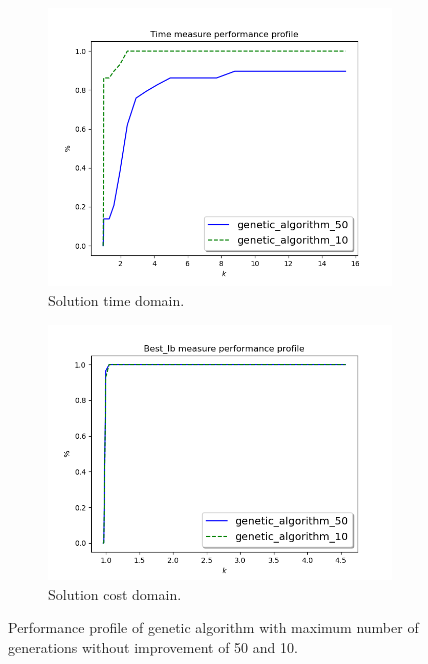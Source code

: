 \begin{figure}[!h]
	\centering
	\begin{subfigure}{0.7\columnwidth}
		\centering
		\includegraphics[width=\columnwidth]{../res/ga_10_50_time.png}
		\caption{Solution time domain.}
		\label{fig:ga_10_50_time}
	\end{subfigure}
	\begin{subfigure}{0.7\columnwidth}
		\centering
		\includegraphics[width=\columnwidth]{../res/ga_10_50_lb.png}
		\caption{Solution cost domain.}
		\label{fig:ga_10_50_lb}
	\end{subfigure}
	\caption{Performance profile of genetic algorithm with maximum number of generations without improvement of 50 and 10.}
	\label{fig:ga_10_50}
\end{figure}



